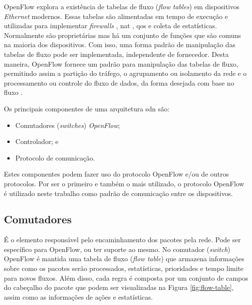 OpenFlow explora a existência de tabelas de fluxo (\textit{flow tables}) em dispositivos \textit{Ethernet} modernos. Essas tabelas são alimentadas em tempo de execução e utilizadas para implementar \textit{firewalls} \cite{Oppliger:1997}, \gls{nat} \cite{RFC3022}, \gls{qos} \cite{Aurrecoechea:1998} e coleta de estatísticas. Normalmente são proprietárias mas há um conjunto de funções que são comuns na maioria dos dispositivos. Com isso, uma forma padrão de manipulação das tabelas de fluxo pode ser implementada, independente de fornecedor. Desta maneira, OpenFlow fornece um padrão para manipulação das tabelas de fluxo, permitindo assim a partição do tráfego, o agrupamento ou isolamento da rede e o processamento ou controle do fluxo de dados, da forma desejada com base no fluxo \cite{Kontesidou:2009}.

Os principais componentes de uma arquitetura \gls{sdn} são:
\begin{itemize}
    \item Comutadores (\textit{switches}) \textit{OpenFlow};
    \item Controlador; e
    \item Protocolo de comunicação.
\end{itemize}
Estes componentes podem fazer uso do protocolo OpenFlow e/ou de outros protocolos. Por ser o primeiro e também o mais utilizado, o protocolo OpenFlow é utilizado neste trabalho como padrão de comunicação entre os dispositivos.


\subsection{Comutadores}
\label{subsec:comutador}

É o elemento responsável pelo encaminhamento dos pacotes pela rede. Pode ser específico para OpenFlow, ou ter suporte ao mesmo. No comutador (\textit{switch}) OpenFlow é mantida uma tabela de fluxo (\textit{flow table}) que armazena informações sobre como os pacotes serão processados, estatísticas, prioridades e tempo limite para novos fluxos. Além disso, cada regra é composta por um conjunto de campos do cabeçalho do pacote que podem ser visualizadas na Figura \ref{fig:flow-table}, assim como as informações de ações e estatísticas.

